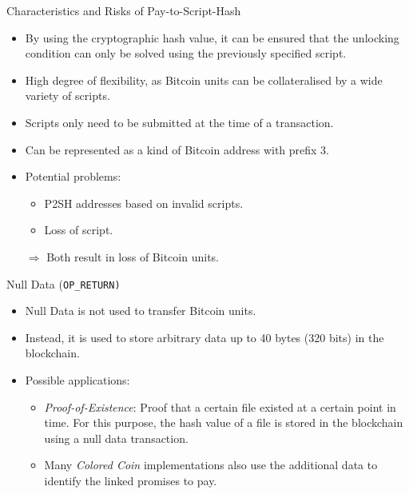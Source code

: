 \documentclass[handout]{beamer}
\begin{document}
\begin{frame}{Characteristics and Risks of Pay-to-Script-Hash}
\begin{itemize}
	\item<1-> By using the cryptographic hash value, it can be ensured that the unlocking condition can only be solved using the previously specified script.
	\item<2-> High degree of flexibility, as Bitcoin units can be collateralised by a wide variety of scripts.
	\item<3-> Scripts only need to be submitted at the time of a transaction. %
	\item<4-> Can be represented as a kind of Bitcoin address with prefix 3. %
	\vspace{1em}
	\item<5-> Potential problems:
	\begin{itemize}
  \item<5-> P2SH addresses based on invalid scripts.
  \item<5-> Loss of script.
\end{itemize}\vspace{0.5em}
$\Rightarrow$ Both result in loss of Bitcoin units.
\end{itemize}
\end{frame}


\begin{frame}{Null Data (\texttt{OP\_RETURN)}}
\begin{itemize}
  \item<1-> Null Data is not used to transfer Bitcoin units.
  \item<2-> Instead, it is used to store arbitrary data up to 40 bytes (320 bits) in the blockchain.
  \item<3-> Possible applications:
    \begin{itemize}
      \item<3-> \textit{Proof-of-Existence}: Proof that a certain file existed at a certain point in time. For this purpose, the hash value of a file is stored in the blockchain using a null data transaction.
      \item<3-> Many \textit{Colored Coin} implementations also use the additional data to identify the linked promises to pay.
    \end{itemize}
\end{itemize}
\end{frame}
\end{document}
